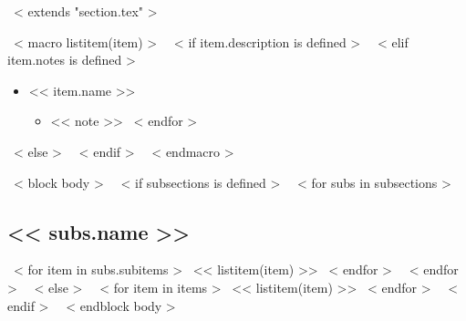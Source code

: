 ~< extends "section.tex" >~

~< macro listitem(item) >~
  ~< if item.description is defined >~
  ~< elif item.notes is defined >~
    \begin{itemize}
      \item{<< item.name >>}
      \begin{itemize}
      ~< for note in item.notes >~
        \item{<< note >>}
      ~< endfor >~
      \end{itemize}
    \end{itemize}
  ~< else >~
  ~< endif >~
~< endmacro >~

~< block body >~
  ~< if subsections is defined >~
    ~< for subs in subsections >~
      \subsection{<< subs.name >>}
        ~< for item in subs.subitems >~
          << listitem(item) >>
        ~< endfor >~
    ~< endfor >~
  ~< else >~
    ~< for item in items >~
      << listitem(item) >>
    ~< endfor >~
  ~< endif >~
~< endblock body >~

